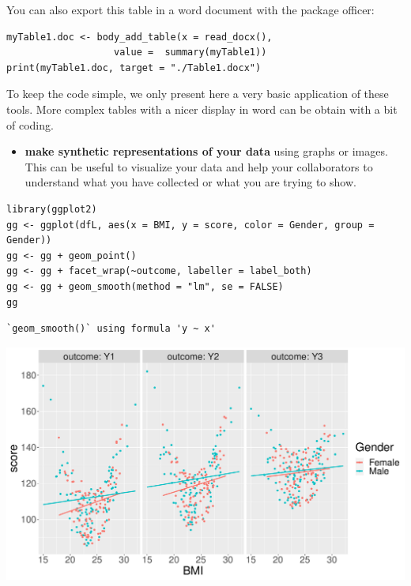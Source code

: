 \documentclass[12pt]{article}
\begin{document}
You can also export this table in a word document with the package
officer:
\lstset{language=r,label= ,caption= ,captionpos=b,numbers=none}
\begin{lstlisting}
myTable1.doc <- body_add_table(x = read_docx(), 
			       value =  summary(myTable1)) 
print(myTable1.doc, target = "./Table1.docx")
\end{lstlisting}

To keep the code simple, we only present here a very basic application
of these tools. More complex tables with a nicer display in word can
be obtain with a bit of coding.

\clearpage

\begin{itemize}
\item \textbf{make synthetic representations of your data} using graphs or
images. This can be useful to visualize your data and help your
collaborators to understand what you have collected or what you are
trying to show.
\end{itemize}

\lstset{language=r,label= ,caption= ,captionpos=b,numbers=none}
\begin{lstlisting}
library(ggplot2)
gg <- ggplot(dfL, aes(x = BMI, y = score, color = Gender, group = Gender))
gg <- gg + geom_point()
gg <- gg + facet_wrap(~outcome, labeller = label_both)
gg <- gg + geom_smooth(method = "lm", se = FALSE)
gg
\end{lstlisting}

\begin{verbatim}
`geom_smooth()` using formula 'y ~ x'
\end{verbatim}

\begin{center}
\includegraphics[width=.9\linewidth]{./figures/descriptive.pdf}
\end{center}
\end{document}
